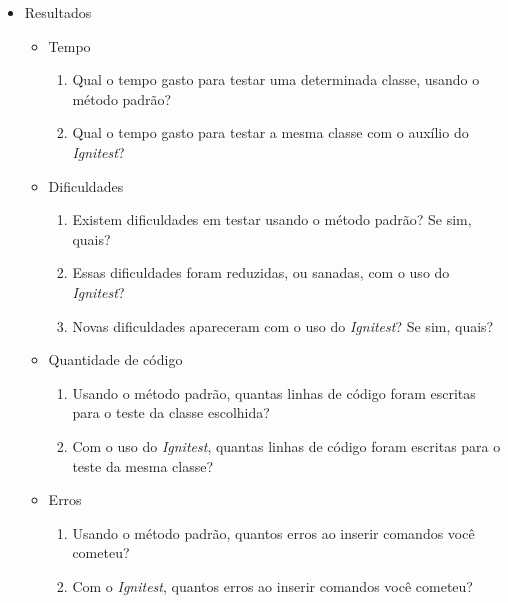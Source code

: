 \begin{itemize}
        \item Resultados
            \begin{itemize}
                \item Tempo
                    \begin{enumerate}
                        \item Qual o tempo gasto para testar uma determinada classe, usando o método padrão?
                        \item Qual o tempo gasto para testar a mesma classe com o auxílio do \textit{Ignitest}?
                    \end{enumerate}
                \item Dificuldades
                    \begin{enumerate}
                        \item Existem dificuldades em testar usando o método padrão? Se sim, quais?
                        \item Essas dificuldades foram reduzidas, ou sanadas, com o uso do \textit{Ignitest}?
                        \item Novas dificuldades apareceram com o uso do \textit{Ignitest}? Se sim, quais?
                    \end{enumerate}
                \item Quantidade de código
                    \begin{enumerate}
                        \item Usando o método padrão, quantas linhas de código foram escritas para o teste da classe escolhida?
                        \item Com o uso do \textit{Ignitest}, quantas linhas de código foram escritas para o teste da mesma classe?
                    \end{enumerate}

\vfill
\pagebreak

                \item Erros
                    \begin{enumerate}
                        \item Usando o método padrão, quantos erros ao inserir comandos você cometeu?
                        \item Com o \textit{Ignitest}, quantos erros ao inserir comandos você cometeu?
                    \end{enumerate}
            \end{itemize}
        

\end{itemize}
